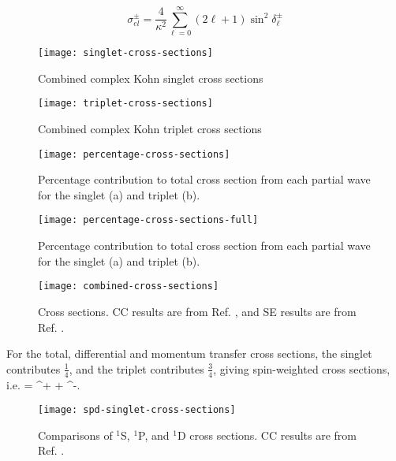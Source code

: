 \documentclass[Dissertation.tex]{subfiles}
\begin{document}
\begin{equation}
\label{eq:TotalCross}
\sigma_{el}^\pm = \frac{4}{\kappa^2} \sum_{\ell=0}^\infty (2\ell+1) \sin^2 \delta_\ell^\pm
\end{equation}

\begin{figure}[H]
	\centering
	\texttt{[image: singlet-cross-sections]}
	\caption{Combined complex Kohn singlet cross sections}
	\label{fig:singlet-cross-sections}
\end{figure}

\begin{figure}[H]
	\centering
	\texttt{[image: triplet-cross-sections]}
	\caption{Combined complex Kohn triplet cross sections}
	\label{fig:triplet-cross-sections}
\end{figure}

\begin{figure}[H]
	\centering
	\texttt{[image: percentage-cross-sections]}
	\caption[Percentage contribution to total cross section]{Percentage contribution to total cross section from each partial wave for the singlet (a) and triplet (b).}
	\label{fig:percentage-cross-sections}
\end{figure}

\begin{figure}[H]
	\centering
	\texttt{[image: percentage-cross-sections-full]}
	\caption[Percentage contribution to total cross section]{Percentage contribution to total cross section from each partial wave for the singlet (a) and triplet (b).}
	\label{fig:percentage-cross-sections-full}
\end{figure}

\begin{figure}[H]
	\centering
	\texttt{[image: combined-cross-sections]}
	\caption[Cross sections.]{Cross sections. CC results are from Ref. \cite{Walters2004}, and SE results are from Ref. \cite{Hara1975}.}
	\label{fig:combined-cross-sections}
\end{figure}


For the total, differential and momentum transfer cross sections, the singlet contributes $\frac{1}{4}$, and the triplet contributes $\frac{3}{4}$, giving spin-weighted cross sections, i.e. \cite{Ward1987}
\beq
\label{eq:SpinWeightCS}
\sigma =  \sigma^+ +  \sigma^-.
\eeq


\label{sec:crosscompare}
\begin{figure}[H]
	\centering
	\texttt{[image: spd-singlet-cross-sections]}
	\caption[Comparisons of $^1$S, $^1$P, and $^1$D cross sections.]{Comparisons of $^1$S, $^1$P, and $^1$D cross sections. CC results are from Ref. \cite{Walters2004}.}
	\label{fig:spd-singlet-cross-sections}
\end{figure}
\end{document}
